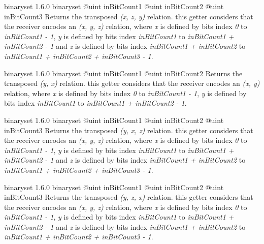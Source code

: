 {binaryset}
{1.6.0}
{binaryset}
{@uint inBitCount1}
{@uint inBitCount2}
{@uint inBitCount3}
{Returns the transposed \emph{(x, z, y)} relation.}
{this getter considers that the receiver encodes an \emph{(x, y, z)} relation, where \emph{x} is defined by bits index \emph{0} to \emph{inBitCount1  - 1}, \emph{y} is defined by bits index \emph{inBitCount1} to \emph{inBitCount1 + inBitCount2 - 1} and  \emph{z} is defined by bits index \emph{inBitCount1 + inBitCount2} to \emph{inBitCount1 + inBitCount2 + inBitCount3 - 1}.}







{binaryset}
{1.6.0}
{binaryset}
{@uint inBitCount1}
{@uint inBitCount2}
{Returns the transposed \emph{(y, x)} relation.}
{this getter considers that the receiver encodes an \emph{(x, y)} relation, where \emph{x} is defined by bits index \emph{0} to \emph{inBitCount1  - 1}, \emph{y} is defined by bits index \emph{inBitCount1} to \emph{inBitCount1 + inBitCount2 - 1}.}







{binaryset}
{1.6.0}
{binaryset}
{@uint inBitCount1}
{@uint inBitCount2}
{@uint inBitCount3}
{Returns the transposed \emph{(y, x, z)} relation.}
{this getter considers that the receiver encodes an \emph{(x, y, z)} relation, where \emph{x} is defined by bits index \emph{0} to \emph{inBitCount1  - 1}, \emph{y} is defined by bits index \emph{inBitCount1} to \emph{inBitCount1 + inBitCount2 - 1} and  \emph{z} is defined by bits index \emph{inBitCount1 + inBitCount2} to \emph{inBitCount1 + inBitCount2 + inBitCount3 - 1}.}







{binaryset}
{1.6.0}
{binaryset}
{@uint inBitCount1}
{@uint inBitCount2}
{@uint inBitCount3}
{Returns the transposed \emph{(y, z, x)} relation.}
{this getter considers that the receiver encodes an \emph{(x, y, z)} relation, where \emph{x} is defined by bits index \emph{0} to \emph{inBitCount1  - 1}, \emph{y} is defined by bits index \emph{inBitCount1} to \emph{inBitCount1 + inBitCount2 - 1} and  \emph{z} is defined by bits index \emph{inBitCount1 + inBitCount2} to \emph{inBitCount1 + inBitCount2 + inBitCount3 - 1}.}







